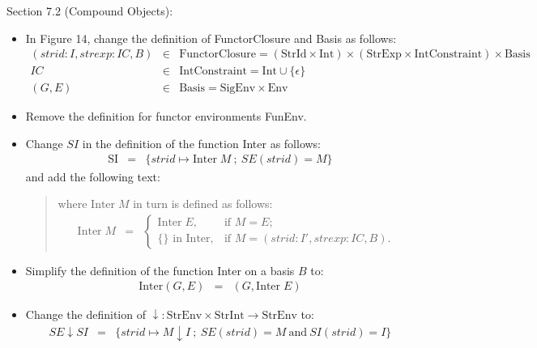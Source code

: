 \documentclass[twoside,titlepage]{article}
\begin{document}
\begin{appendix}
Section 7.2 (Compound Objects):
\begin{itemize}
\item In Figure 14, change the definition of FunctorClosure and Basis as follows:
  \begin{eqnarray*}
  (\mathit{strid}:I, \mathit{strexp}:\mathit{IC}, B) &\in& \mbox{FunctorClosure} = (\mbox{StrId}\times\mbox{Int})\times(\mbox{StrExp}\times\mbox{IntConstraint})\times\mbox{Basis} \\
  \mathit{IC} &\in& \mbox{IntConstraint} = \mbox{Int} \cup \{\epsilon\} \\
  (G,E) &\in& \mbox{Basis} = \mbox{SigEnv} \times \mbox{Env}
  \end{eqnarray*}

\item Remove the definition for functor environments FunEnv.

\item Change $\mathit{SI}$ in the definition of the function Inter as follows:
  \begin{eqnarray*}
  \mbox{SI} &=& \{\mathit{strid}\mapsto\mbox{Inter}\;M~;~\mathit{SE}(\mathit{strid}) = M\}
  \end{eqnarray*}
  and add the following text:
  \begin{quote}
  where $\mbox{Inter}\;M$ in turn is defined as follows:
  \begin{eqnarray*}
  \mbox{Inter}\;M &=& \left\{
    \begin{array}{ll}
    \mbox{Inter}\;E, & \textrm{if $M = E$;} \\
    \mbox{$\{\}$ in Inter}, & \textrm{if $M = (\mathit{strid}:I', \mathit{strexp}:\mathit{IC}, B)$.}
    \end{array} \right.
  \end{eqnarray*}
  \end{quote}

\item Simplify the definition of the function Inter on a basis $B$ to:
  \begin{eqnarray*}
  \mbox{Inter}(G,E) &=& (G, \mbox{Inter}\;E)
  \end{eqnarray*}

\item Change the definition of $\downarrow : \mbox{StrEnv} \times \mbox{StrInt} \to \mbox{StrEnv}$ to:
  \begin{eqnarray*}
  \mathit{SE}\downarrow\mathit{SI} &=& \{\mathit{strid}\mapsto M \downarrow I~;~\mathit{SE}(\mathit{strid}) = M~\mbox{and}~\mathit{SI}(\mathit{strid}) = I\}
  \end{eqnarray*}


\end{itemize}
\end{appendix}
\end{document}

